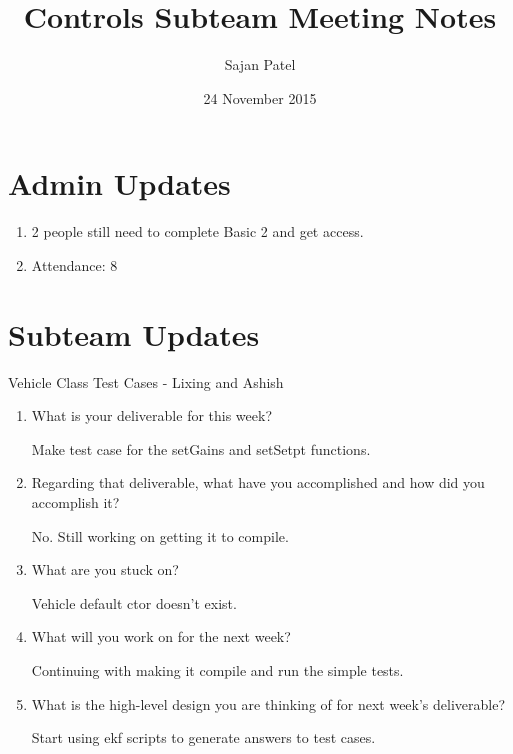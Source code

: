 \documentclass{article}
\begin{document}
\title{Controls Subteam Meeting Notes}
\author{Sajan Patel}
\date{24 November 2015}
\maketitle

\section{Admin Updates}
\begin{enumerate}
\item 2 people still need to complete Basic 2 and get access.
\item Attendance: 8
\end{enumerate}

\section{Subteam Updates}
Vehicle Class Test Cases - Lixing and Ashish
\begin{enumerate}
    \item What is your deliverable for this week?

    Make test case for the setGains and setSetpt functions.

    \item Regarding that deliverable, what have you accomplished and how did
        you accomplish it?

    No. Still working on getting it to compile.

    \item What are you stuck on?

    Vehicle default ctor doesn't exist.

    \item What will you work on for the next week?
    
    Continuing with making it compile and run the simple tests.

    \item What is the high-level design you are thinking of for next week's
        deliverable?
    
    Start using ekf scripts to generate answers to test cases.

\end{enumerate}
\end{document}
